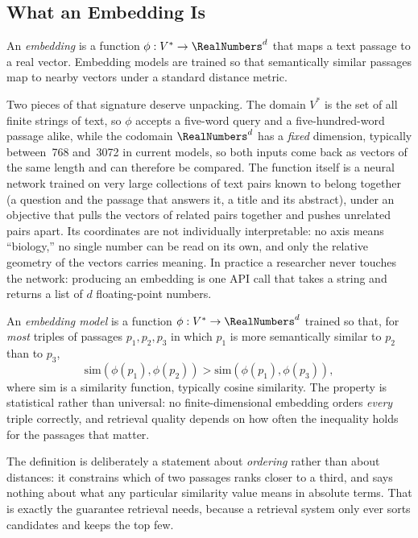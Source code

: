 \subsection{What an Embedding Is}

An \emph{embedding} is a function $\phi: V^* \to \RealNumbers^d$ that maps a text passage to a real vector.
Embedding models are trained so that semantically similar passages map to nearby vectors under a standard distance metric.

Two pieces of that signature deserve unpacking.
The domain $V^*$ is the set of all finite strings of text, so $\phi$ accepts a five-word query and a five-hundred-word passage alike, while the codomain $\RealNumbers^d$ has a \emph{fixed} dimension, typically between~768 and~3072 in current models, so both inputs come back as vectors of the same length and can therefore be compared.
The function itself is a neural network trained on very large collections of text pairs known to belong together (a question and the passage that answers it, a title and its abstract), under an objective that pulls the vectors of related pairs together and pushes unrelated pairs apart.
Its coordinates are not individually interpretable: no axis means ``biology,'' no single number can be read on its own, and only the relative geometry of the vectors carries meaning.
In practice a researcher never touches the network: producing an embedding is one API call that takes a string and returns a list of $d$ floating-point numbers.

\begin{definition}
\label{definition:Embedding}
An \emph{embedding model} is a function $\phi: V^* \to \RealNumbers^d$ trained so that, for \emph{most} triples of passages $p_1, p_2, p_3$ in which $p_1$ is more semantically similar to $p_2$ than to $p_3$,
\begin{equation}
\mathrm{sim}(\phi(p_1), \phi(p_2)) > \mathrm{sim}(\phi(p_1), \phi(p_3)) ,
\end{equation}
where $\mathrm{sim}$ is a similarity function, typically cosine similarity.
The property is statistical rather than universal: no finite-dimensional embedding orders \emph{every} triple correctly, and retrieval quality depends on how often the inequality holds for the passages that matter.
\end{definition}

The definition is deliberately a statement about \emph{ordering} rather than about distances: it constrains which of two passages ranks closer to a third, and says nothing about what any particular similarity value means in absolute terms.
That is exactly the guarantee retrieval needs, because a retrieval system only ever sorts candidates and keeps the top few.

